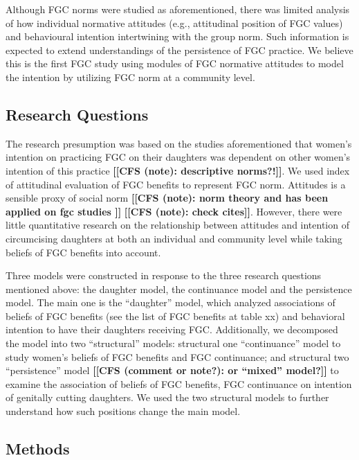 \documentclass[12pt,]{article}
\newcommand{\comment}[1]{\textbf{[[#1]]}}
\newcommand{\cfonly}[1]{\comment{CFS (note): #1}}
\newcommand{\cf}[1]{\comment{CFS (comment or note?): #1}}
\begin{document}
Although FGC norms were studied as aforementioned, there was limited analysis of how individual normative attitudes (e.g., attitudinal position of FGC values) and behavioural intention intertwining with the group norm.  Such information is expected to extend understandings of the persistence of FGC practice.  We believe this is the first FGC study using modules of FGC normative attitudes to model the intention by utilizing FGC norm at a community level.

\subsection{Research Questions}\label{research-questions}

The research presumption was based on the studies aforementioned that women’s intention on practicing FGC on their daughters was dependent on other women’s intention of this practice \cfonly{descriptive norms?!}. We used index of attitudinal evaluation of FGC benefits to represent FGC norm.  Attitudes is a sensible proxy of social norm \cfonly {norm theory \cite{Ajze91, Ajze02, Bicc10, BiccMari15, Mack96, Mack00, MackLeJe08, RimaLapi15, Youn11} and has been applied on fgc studies \cite{CislHeis18, EffeVogt15, Harf06, ModrLiu13, PashPonn16, ShelHern06,}} \cfonly{check cites}.  However, there were little quantitative research on the relationship between attitudes and intention of circumcising daughters at both an individual and community level while taking beliefs of FGC benefits into account.

Three models were constructed in response to the three research questions mentioned above:  the daughter model, the continuance model and the persistence model.  The main one is the “daughter” model, which analyzed associations of beliefs of FGC benefits (see the list of FGC benefits at table xx) and behavioral intention to have their daughters receiving FGC.  Additionally, we decomposed the model into two “structural” models:  structural one “continuance” model to study women’s beliefs of FGC benefits and FGC continuance; and structural two “persistence”  model \cf{or “mixed” model?} to examine the association of beliefs of FGC benefits, FGC continuance on intention of genitally cutting daughters.  We used the two structural models to further understand how such positions change the main model.

\subsection{Methods}\label{methods}
\end{document}
